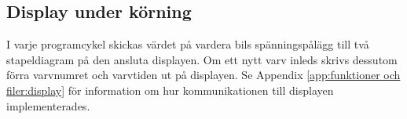 \subsection{Display under körning}

I varje programcykel skickas värdet på vardera bils spänningspålägg
till två stapeldiagram på den ansluta displayen. Om ett nytt varv inleds skrivs
dessutom förra varvnumret och varvtiden ut på displayen. Se Appendix
\ref{app:funktioner och filer:display} för information om hur kommunikationen
till displayen implementerades.

